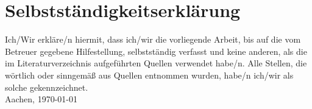 \chapter{Selbstständigkeitserklärung}\label{selbstständigkeitserklärung}

\ifpdf{}\fi 

Ich/Wir erkläre/n hiermit, dass ich/wir die vorliegende Arbeit, bis auf die vom Betreuer gegebene Hilfestellung, selbstständig verfasst und keine anderen, als die im Literaturverzeichnis aufgeführten Quellen verwendet habe/n. Alle Stellen, die wörtlich oder sinngemäß aus Quellen entnommen wurden, habe/n ich/wir als solche gekennzeichnet.\\

Aachen, \today \\